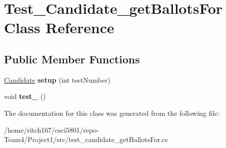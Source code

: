 \hypertarget{classTest__Candidate__getBallotsFor}{}\section{Test\+\_\+\+Candidate\+\_\+get\+Ballots\+For Class Reference}
\label{classTest__Candidate__getBallotsFor}
\subsection*{Public Member Functions}
\begin{DoxyCompactItemize}
\item 
\mbox{\label{classTest__Candidate__getBallotsFor_aa5b3219d4a16db63d2529e6d61e63ab7}} 
\hyperlink{classCandidate}{Candidate} {\bfseries setup} (int test\+Number)
\item 
\mbox{\label{classTest__Candidate__getBallotsFor_a6f2e1c54a9f3fde5da1e2aa0e1adfbfb}} 
void {\bfseries test\+\_} ()
\end{DoxyCompactItemize}


The documentation for this class was generated from the following file\+:\begin{DoxyCompactItemize}
\item 
/home/ritch167/csci5801/repo-\/\+Team4/\+Project1/src/test\+\_\+candidate\+\_\+get\+Ballots\+For.\+cc\end{DoxyCompactItemize}
